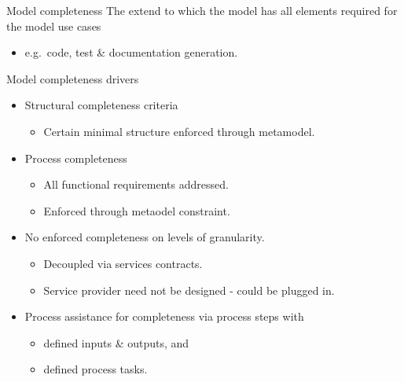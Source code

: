\begin{frame}{Model completeness}
	 The extend to which the model has all elements required for the model use cases
		\begin{itemize} 
			 \item e.g.\ code, test \& documentation generation.
		  \end{itemize}
  \pause
  \begin{block}{Model completeness drivers}
	 \begin{itemize}
		\item<+-| alert@+> Structural completeness criteria
		  \begin{itemize}
			 \item Certain minimal structure enforced through metamodel.
		  \end{itemize}
		\item<+-| alert@+> Process completeness
		  \begin{itemize}
			 \item All functional requirements addressed.
		    \item Enforced through metaodel constraint.
		  \end{itemize}
		\item<+-| alert@+> No enforced completeness on levels of granularity.
		  \begin{itemize}
			 \item Decoupled via services contracts.
			 \item Service provider need not be designed - could be plugged in.
		  \end{itemize}
		\item<+-| alert@+> Process assistance for completeness via process steps with
		  \begin{itemize}
			 \item defined inputs \& outputs, and
			 \item defined process tasks.
		  \end{itemize}
	 \end{itemize}
  \end{block}
\end{frame}


